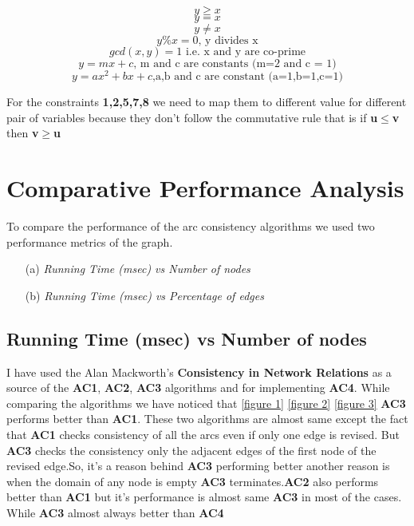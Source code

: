 \documentclass[11pt , conference]{IEEEtran}
\begin{document}
	\begin{equation}
	y \geq x
	\end{equation}
	\begin{equation}
	y=x
	\end{equation}
	\begin{equation}
	y \neq x
	\end{equation}
	\begin{equation}
	y\%x=0 \mbox{, y divides x}
	\end{equation}
	\begin{equation}
	gcd(x,y)=1 \mbox{ i.e. x and y are co-prime}
	\end{equation}
	\begin{equation}
	y=mx + c \mbox{, m and c are constants (m=2 and c = 1)}
	\end{equation}
	\begin{equation}
	y=ax^2 + bx + c \mbox{,a,b and c are constant (a=1,b=1,c=1)}
	\end{equation}
	
		For the constraints \textbf{1,2,5,7,8} we need to map them to different value for different pair of variables because they don't follow the commutative rule that is if \textbf{u$\leq$v} then \textbf{v$\geq$u}
	
	\section{Comparative Performance Analysis}	To compare the performance of the arc consistency algorithms we used two performance metrics of the graph. 
	\begin{enumerate}
\item [(a)] \textit{Running Time (msec) vs Number of nodes}
\item [(b)] \textit{Running Time (msec) vs Percentage of edges}
	\end{enumerate}
	\subsection{Running Time (msec) vs Number of nodes}
	I have used the Alan Mackworth's \textbf{Consistency in Network Relations}\cite{DUMMY:1} as a source of the \textbf{AC1}, \textbf{AC2}, \textbf{AC3} algorithms and \cite{DUMMY:2} for implementing \textbf{AC4}. 
	While comparing the algorithms we have noticed that \ref{figure 1} \ref{figure 2} \ref{figure 3} \textbf{AC3} performs better than \textbf{AC1}. These two algorithms are almost same except the fact that \textbf{AC1} checks consistency of all the arcs even if only one edge is revised. But \textbf{AC3} checks the consistency only the adjacent edges of the first node of the revised edge.So, it's a reason behind \textbf{AC3} performing better another reason is when the domain of any node is empty \textbf{AC3} terminates.\textbf{AC2} also performs better than \textbf{AC1} but it's performance is almost same \textbf{AC3} in most of the cases. While \textbf{AC3} almost always better than \textbf{AC4}\cite{DUMMY:3}
	
\end{document}
